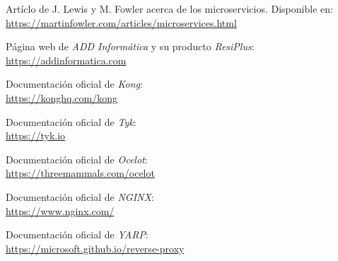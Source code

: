 \documentclass[11pt,spanish,listoffigures]{tfgetsinf}
\begin{document}
\begin{thebibliography}{10}

	Artíclo de J. Lewis y M. Fowler acerca de los microservicios.
	\newblock Disponible en:\\
	\url{https://martinfowler.com/articles/microservices.html}

	Página web de \emph{ADD Informática} y su producto \emph{ResiPlus}:\\
	\url{https://addinformatica.com}

	Documentación oficial de \emph{Kong}:\\
	\url{https://konghq.com/kong}

	Documentación oficial de \emph{Tyk}:\\
	\url{https://tyk.io}

	Documentación oficial de \emph{Ocelot}:\\
	\url{https://threemammals.com/ocelot}

	Documentación oficial de \emph{NGINX}:\\
	\url{https://www.nginx.com/}

	Documentación oficial de \emph{YARP}:\\
	\url{https://microsoft.github.io/reverse-proxy}

\end{thebibliography}
\end{document}
